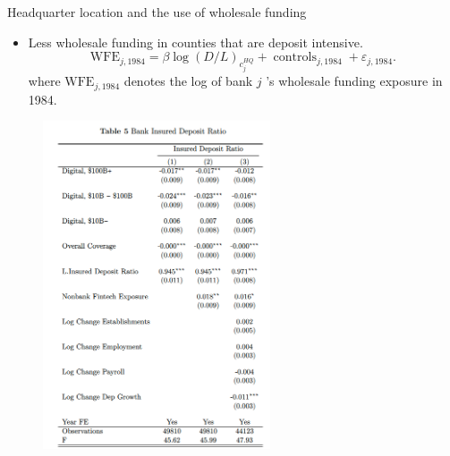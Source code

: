 \documentclass[notes,10pt, aspectratio=169]{beamer}
\begin{document}
    
            \begin{frame}{Headquarter location and the use of wholesale funding         \hyperlink{mismatch_sorting}{}}\label{mismatch_sorting2}
        \begin{itemize}
            \item Less wholesale funding in counties that are deposit intensive.
            $$
            \mathrm{WFE}_{j, 1984}=\beta \log (D / L)_{c_j^{H Q}}+\operatorname{controls}_{j, 1984}+\varepsilon_{j, 1984} .
            $$
            where $\mathrm{WFE}_{j, 1984}$ denotes the log of bank $j$ 's wholesale funding exposure in 1984. %
        \end{itemize}
    
        
        \begin{figure}
            \centering
            \includegraphics[width=0.6\textwidth]{imgs/tab5.png}
            \label{fig:my_label}
        \end{figure}
        
        \end{frame}
    
\end{document}
